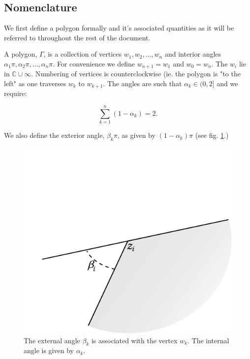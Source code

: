 \documentclass[a4paper,10pt]{amsart}
\begin{document}
\subsection{Nomenclature}

We first define a polygon formally and it's associated quantities as it will be referred to throughout the rest of the document.

A polygon, $\Gamma$, is a collection of vertices $w_1, w_2,\dots,w_n$ and interior angles $\alpha_1\pi, \alpha_2\pi, \dots, \alpha_n\pi$. For convenience we define $w_{n+1} = w_1$ and $w_0=w_n$. The $w_i$ lie in $\mathbb{C} \cup {\infty}$. Numbering of vertices is counterclockwise (ie. the polygon is "to the left" as one traverses $w_k$ to $w_{k+1}$. The angles are such that $\alpha_k \in (0,2]$ and we require:

\begin{equation}
\sum_{k=1}^n (1-\alpha_k) = 2.
\end{equation}

We also define the exterior angle, $\beta_k\pi$, as given by $(1-\alpha_k)\pi$ (see fig. \ref{anglediagram}.)

\begin{figure} [tbp]
\centering
\includegraphics[scale=0.6]{figs/anglediagram.pdf}
\caption{The external angle $\beta_k$ is associated with the vertex $w_k$. The internal angle is given by $\alpha_k$.}
\label{anglediagram}
\end{figure}
\end{document}

